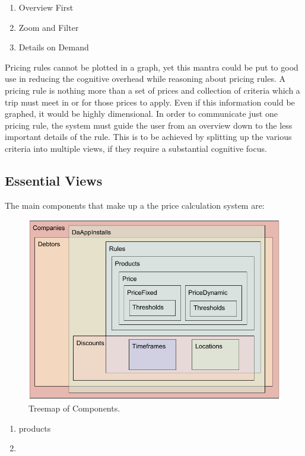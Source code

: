 \begin{enumerate}
	\item Overview First
	\item Zoom and Filter
	\item Details on Demand
\end{enumerate}

Pricing rules cannot be plotted in a graph, yet this mantra could be put to good use in reducing the cognitive overhead while reasoning about pricing rules. A pricing rule is nothing more than a set of prices and collection of criteria which a trip must meet in or for those prices to apply. Even if this information could be graphed, it would be highly dimensional. In order to communicate just one pricing rule, the system must guide the user from an overview down to the less important details of the rule. This is to be achieved by splitting up the various criteria into multiple views, if they require a substantial cognitive focus.

\subsection{Essential Views}
The main components that make up a the price calculation system are:

\begin{figure}[H]
	\centering
	\includegraphics[width=1\textwidth]{Treemap}
	\caption[Treemap of Components]{Treemap of Components.}
	\label{fig:Treemap}
\end{figure}

\begin{enumerate}
	\item products
	\item
\end{enumerate}

